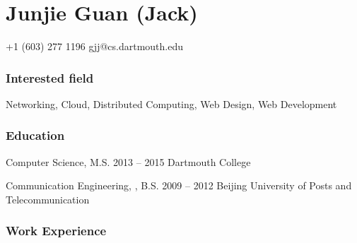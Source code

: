 \documentclass{tccv}
\begin{document}
\part{Junjie Guan (Jack)}

\begin{multicols}{2}



    {+1 (603) 277 1196}
    {gjj@cs.dartmouth.edu}

\section{Interested field}
Networking, Cloud, Distributed Computing, Web Design, Web Development


\section{Education}

\begin{yearlist}

\item[Computer Science, M.S.]{2013 -- 2015}
     {Dartmouth College}

\item[Communication Engineering, , B.S.]{2009 -- 2012}
     {Beijing University of Posts and Telecommunication}

\end{yearlist}

\end{multicols}















\section{Work Experience}
\end{document}

